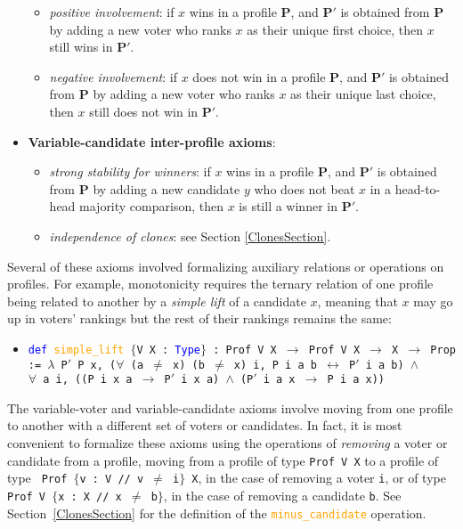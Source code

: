 \documentclass[runningheads]{llncs}
\begin{document}
\begin{itemize}
\begin{itemize}
\item \textit{positive involvement}: if $x$ wins in a profile $\mathbf{P}$, and $\mathbf{P}'$ is obtained from $\mathbf{P}$ by adding a new voter who ranks $x$ as their unique first choice, then $x$ still wins in $\mathbf{P}'$.
\item \textit{negative involvement}: if $x$ does not win in a profile $\mathbf{P}$, and $\mathbf{P}'$ is obtained from $\mathbf{P}$ by adding a new voter who ranks $x$ as their unique last choice, then $x$ still does not win in $\mathbf{P}'$.\\
\end{itemize}
\item[] \textbf{Variable-candidate inter-profile axioms}:
\begin{itemize}
\item \textit{strong stability for winners}: if $x$ wins in a profile $\mathbf{P}$, and $\mathbf{P}'$ is obtained from $\mathbf{P}$ by adding a new candidate $y$ who does not beat $x$ in a head-to-head majority comparison, then $x$ is still a winner in $\mathbf{P}'$. 
\item \textit{independence of clones}: see Section \ref{ClonesSection}.
\end{itemize}
\end{itemize}

Several of these axioms involved formalizing auxiliary relations or operations on profiles. For example, monotonicity requires the ternary relation of one profile being related to another by a \textit{simple lift} of a candidate $x$, meaning that $x$ may go up in voters' rankings but the rest of their rankings remains the same:

\begin{itemize}
\item[] \texttt{\textcolor{blue}{def} \textcolor{orange}{simple\_lift} $\{$V X : \textcolor{blue}{Type}$\}$ : Prof V X $\to$ Prof V X $\to$ X $\to$ Prop := 
    $\lambda$ P$'$ P x, ($\forall$ (a $\neq$ x) (b $\neq$ x) i, P i a b $\leftrightarrow$ P$'$ i a b) 
    $\wedge$  \\$\forall$ a i, ((P i x a $\to$ P$'$ i x a) $\wedge$ (P$'$ i a x $\to$ P i a x))}
 \end{itemize}
The variable-voter and variable-candidate axioms involve moving from one profile to another with a different set of voters or candidates. In fact, it is most convenient to formalize these axioms using the operations of \textit{removing} a voter or candidate from a profile, moving from a profile of type \texttt{Prof V X} to a profile of type  \texttt{ Prof $\{$v : V // v $\neq$ i$\}$ X}, in the case of removing a voter \texttt{i}, or of type \texttt{Prof V $\{$x : X // x $\neq$ b$\}$}, in the case of removing a candidate \texttt{b}. See Section~\ref{ClonesSection} for the definition of the \textcolor{orange}{\texttt{minus\_candidate}} operation.
\end{document}
